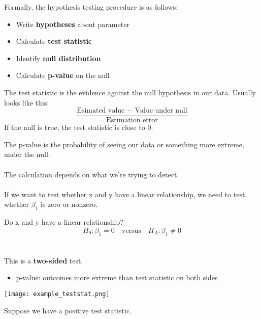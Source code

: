 \documentclass[xcolor={dvipsnames,svgnames},14pt]{beamer}
\begin{document}
\begin{frame}
Formally, the hypothesis testing procedure is as follows: \begin{itemize}
\item Write \textbf{hypotheses} about parameter
\item Calculate \textbf{test statistic}
\item Identify \textbf{null distribution}
\item Calculate \textbf{p-value} on the null
\end{itemize}
\end{frame}

\begin{frame}
The test statistic is the evidence against the null hypothesis in our data.  Usually looks like this: 
$$\frac{\text{Esimated value } - \text{ Value under null}}{\text{Estimation error}}$$
If the null is true, the test statistic is close to 0.
\end{frame}

\begin{frame}
The p-value is the probability of seeing our data or something more extreme, under the null.  \\~\\

The calculation depends on what we're trying to detect. \\~\\

If we want to test whether x and y have a linear relationship, we need to test whether $\beta_1$ is zero or nonzero.
\end{frame}

\begin{frame}
Do x and y have a linear relationship?
$$H_0: \beta_1 = 0 \quad \text{versus} \quad H_A: \beta_1 \neq 0$$ \\~\\
This is a \textbf{two-sided} test. \begin{itemize}
\item p-value: outcomes more extreme than test statistic on both sides
\end{itemize}
\end{frame}

\begin{frame}
\begin{center}
\texttt{[image: example\_teststat.png]}
\end{center}
Suppose we have a positive test statistic.
\end{frame}
\end{document}
